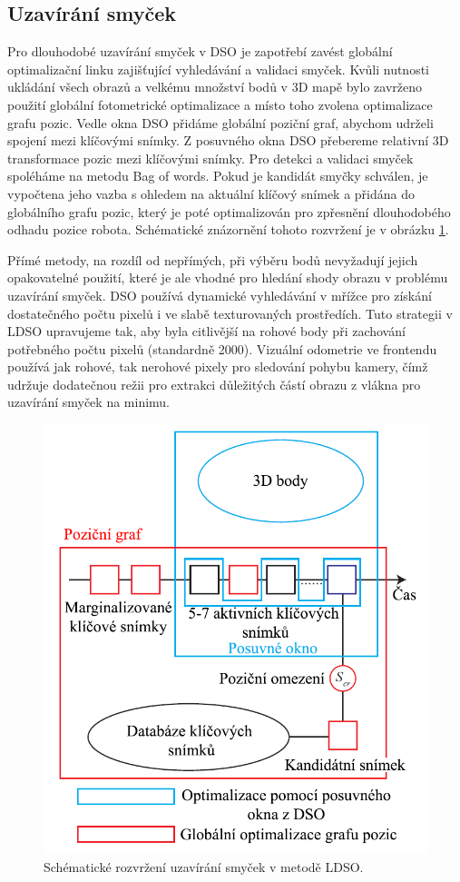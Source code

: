 \documentclass[12pt,a4paper]{report}
\begin{document}
\subsection*{Uzavírání smyček}
Pro dlouhodobé uzavírání smyček v DSO je zapotřebí zavést globální optimalizační linku zajišťující vyhledávání a validaci smyček. Kvůli nutnosti ukládání všech obrazů a velkému množství bodů v 3D mapě bylo zavrženo použití globální fotometrické optimalizace a místo toho zvolena optimalizace grafu pozic. Vedle okna DSO přidáme globální poziční graf, abychom udrželi spojení mezi klíčovými snímky. Z posuvného okna DSO přebereme relativní 3D transformace pozic mezi klíčovými snímky. Pro detekci a validaci smyček spoléháme na metodu Bag of words. Pokud je kandidát smyčky schválen, je vypočtena jeho vazba s ohledem na aktuální klíčový snímek a přidána do globálního grafu pozic, který je poté optimalizován pro zpřesnění dlouhodobého odhadu pozice robota. Schématické znázornění tohoto rozvržení je v obrázku \ref{ldso_frame}.

Přímé metody, na rozdíl od nepřímých, při výběru bodů nevyžadují jejich opakovatelné použití, které je ale vhodné pro hledání shody obrazu v problému uzavírání smyček. DSO používá dynamické vyhledávání v mřížce pro získání dostatečného počtu pixelů i ve slabě texturovaných prostředích. Tuto strategii v LDSO upravujeme tak, aby byla citlivější na rohové body při zachování potřebného počtu pixelů (standardně 2000). Vizuální odometrie ve frontendu používá jak rohové, tak nerohové pixely pro sledování pohybu kamery, čímž udržuje dodatečnou režii pro extrakci důležitých částí obrazu z vlákna pro uzavírání smyček na minimu.

\begin{figure}[H]
\centering
\includegraphics[scale=0.6]{img/LDSO_frame.png}
\caption{Schématické rozvržení uzavírání smyček v metodě LDSO.}
\label{ldso_frame}
\end{figure}
\end{document}
